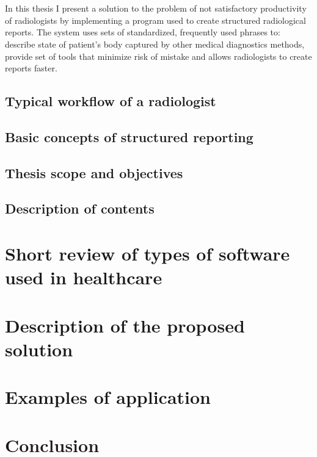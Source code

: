 \documentclass[12pt, twoside, openany]{report}
\theoremstyle{definition}
\begin{document}
\\ \\
In this thesis I present a solution to the problem of not satisfactory productivity of radiologists by implementing a program used to create structured radiological reports. The system uses sets of standardized, frequently used phrases to: describe state of patient's body captured by other medical diagnostics methods, provide set of tools that minimize risk of mistake and allows radiologists to create reports faster.

\section{Typical workflow of a radiologist}
\section{Basic concepts of structured reporting}

\section{Thesis scope and objectives}
\section{Description of contents}
\chapter{Short review of types of software used in healthcare}
\chapter{Description of the proposed solution}
\chapter{Examples of application}

\chapter{Conclusion}


\end{document}
